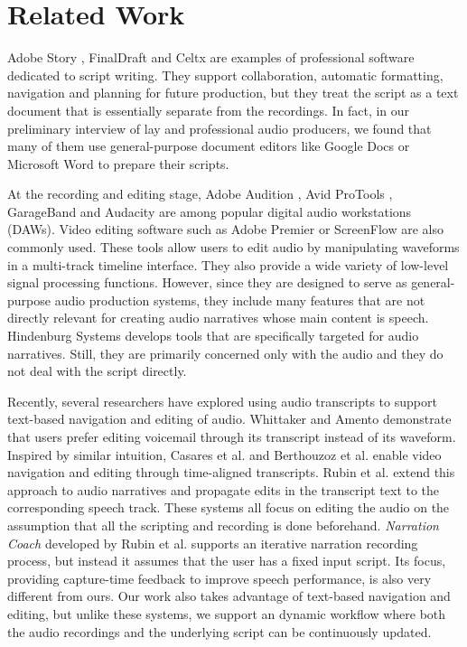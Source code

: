 \section{Related Work}

Adobe Story \cite{adobestory2016}, FinalDraft \cite{finaldraft2016} and Celtx \cite{celtx2016} are examples of professional software dedicated to script writing. They support collaboration, automatic formatting, navigation and planning for future production, but they treat the script as a text document that is essentially separate from the recordings. In fact, in our preliminary interview of lay and professional audio producers, we found that many of them use general-purpose document editors like Google Docs \cite{googledocs2016} or Microsoft Word \cite{microsoftword2016} to prepare their scripts.

At the recording and editing stage, Adobe Audition \cite{adobeaudition2016}, Avid ProTools \cite{avidprotools}, GarageBand \cite{garageband} and Audacity \cite{audacity} are among popular digital audio workstations (DAWs). Video editing software such as Adobe Premier \cite{premier} or ScreenFlow \cite{screenflow} are also commonly used. These tools allow users to edit audio by manipulating waveforms in a multi-track timeline interface. They also provide a wide variety of low-level signal processing functions. However, since they are designed to serve as general-purpose audio production systems, they include many features that are not directly relevant for creating audio narratives whose main content is speech. Hindenburg Systems \cite{hindenburg} develops tools that are specifically targeted for audio narratives. Still, they are primarily concerned only with the audio and they do not deal with the script directly.   

Recently, several researchers have explored using audio transcripts to support text-based navigation and editing of audio. Whittaker and Amento \cite{whittaker2004semantic} demonstrate that users prefer editing voicemail through its transcript instead of its waveform. Inspired by similar intuition, Casares et al. \cite{casares2002simplifying} and Berthouzoz et al. \cite{berthouzoz2012tools} enable video navigation and editing through time-aligned transcripts. Rubin et al. \cite{rubin2013content} extend this approach to audio narratives and propagate edits in the transcript text to the corresponding speech track. These systems all focus on editing the audio on the assumption that all the scripting and recording is done beforehand. \textit{Narration Coach} developed by Rubin et al. 
supports an iterative narration recording process, but instead it assumes that the user has a fixed input script. Its focus, providing capture-time feedback to improve speech performance, is also very different from ours. Our work also takes advantage of text-based navigation and editing, but unlike these systems, we support an dynamic workflow where both the audio recordings and the underlying script can be continuously  updated.      